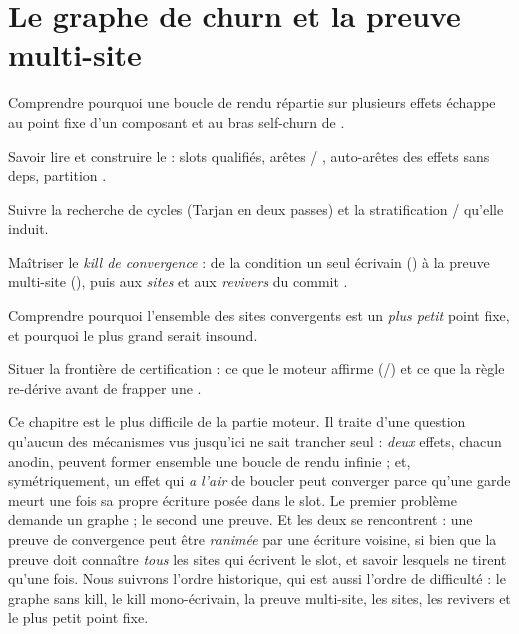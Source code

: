 \chapter{Le graphe de churn et la preuve multi-site}
\label{chap:churn}

\begin{objectifs}
  \item Comprendre pourquoi une boucle de rendu répartie sur plusieurs effets échappe
        au point fixe d'un composant et au bras \og self-churn\fg{} de .
  \item Savoir lire et construire le  : slots qualifiés, arêtes
         / , auto-arêtes des effets sans deps, partition .
  \item Suivre la recherche de cycles (Tarjan en deux passes) et la stratification
        \Error{} / \Warning{} qu'elle induit.
  \item Maîtriser le \emph{kill de convergence} : de la condition \og un seul écrivain\fg{}
        () à la preuve multi-site  (), puis
        aux \emph{sites} et aux \emph{revivers} du commit \snapshotCommit.
  \item Comprendre pourquoi l'ensemble des sites convergents est un \emph{plus petit} point
        fixe, et pourquoi le plus grand serait insound.
  \item Situer la frontière de certification : ce que le moteur affirme (/)
        et ce que la règle re-dérive avant de frapper une \Error.
\end{objectifs}


Ce chapitre est le plus difficile de la partie moteur. Il traite d'une question qu'aucun
des mécanismes vus jusqu'ici ne sait trancher seul : \emph{deux} effets, chacun anodin,
peuvent former ensemble une boucle de rendu infinie ; et, symétriquement, un effet qui
\emph{a l'air} de boucler peut converger parce qu'une garde meurt une fois sa propre
écriture posée dans le slot. Le premier problème demande un graphe ; le second une preuve.
Et les deux se rencontrent : une preuve de convergence peut être \emph{ranimée} par une
écriture voisine, si bien que la preuve doit connaître \emph{tous} les sites qui écrivent
le slot, et savoir lesquels ne tirent qu'une fois. Nous suivrons l'ordre historique, qui
est aussi l'ordre de difficulté : le graphe sans kill, le kill mono-écrivain, la preuve
multi-site, les sites, les revivers et le plus petit point fixe.

